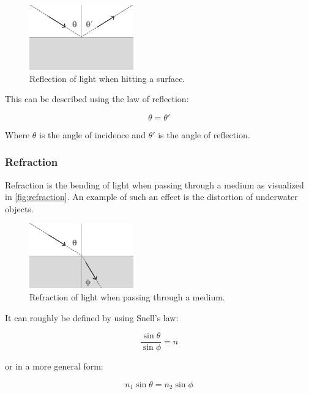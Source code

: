 \begin{figure}[H]
  \centering
  \includegraphics[width=0.4\textwidth]{resources/reflection.png}
  \caption{Reflection of light when hitting a surface.}
  \label{fig:reflection}
\end{figure}

This can be described using the law of reflection:

\begin{equation}
  \label{eqn:law-of-reflection}
  \theta = \theta'
\end{equation}

Where $\theta$ is the angle of incidence and $\theta'$ is the angle of reflection.

\subsubsection{Refraction}

Refraction is the bending of light when passing through a medium as visualized in \autoref{fig:refraction}. An example of such an effect is the distortion of underwater objects.

\begin{figure}[H]
  \centering
  \includegraphics[width=0.4\textwidth]{resources/refraction.png}
  \caption{Refraction of light when passing through a medium.}
  \label{fig:refraction}
\end{figure}

It can roughly be defined by using Snell's law:

\begin{equation}
  \label{eqn:snells-law}
  \frac{\sin \theta}{\sin \phi} = n
\end{equation}

or in a more general form:

\begin{equation}
  \label{eqn:snells-law-general}
  n_1 \sin \theta = n_2 \sin \phi
\end{equation}

